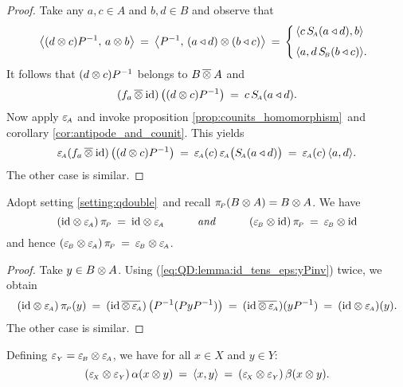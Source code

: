 \begin{proof}
Take any $a,c \in A$ and $b,d \in B$ and observe that
$$ \pairM{(d \tens c)P^{-1}}{a \tens b}
      \:=\:
   \pairM{P^{-1}}{(a \ract d) \tens (b \ract c)}
      \:=\,
   \left\{ \begin{array}{l}
   \!\!  \pair{c\, \SA(a \ract d)}{b} \\
   \!\!  \pair{a}{d\, \SB(b \ract c)}. \vertXL
   \end{array}\right.  $$
It follows that $(d \tens c)P^{-1}$ belongs to $B \fubtens A$ and
$$ (f_a \fubtens \id) \left( (d \tens c) P^{-1} \vertM\right) \:=\: c\, \SA(a \ract d).$$
Now apply $\epsA$ and invoke proposition \ref{prop:counits_homomorphism}\
and corollary \ref{cor:antipode_and_counit}\@. This yields
$$ \epsA (f_a \fubtens \id) \left( (d \tens c) P^{-1} \vertM\right)
    \:=\: \epsA(c) \, \epsA\! \left(\SA(a \ract d)\vertM\right)
    \:=\: \epsA(c) \, \pair{a}{d}. $$
The other case is similar.
\end{proof}



\begin{lemma} \label{lemma:QD:id_tens_eps:piP}
Adopt setting \ref{setting:qdouble}\ and recall\/ $\piP(B\tens A) = B\tens A$. We have
$$(\id \tens \epsA)\, \piP  \:=\:  \id \tens \epsA
         \itandspace{3em}
  (\epsB \tens \id)\, \piP  \:=\:  \epsB \tens \id $$
and hence\/ $(\epsB \tens \epsA)\, \piP  \:=\: \epsB \tens \epsA$.
\end{lemma}

\begin{proof}
Take $y \in B \tens A$. Using (\ref{eq:QD:lemma:id_tens_eps:yPinv}) twice, we obtain
$$    (\id \tens \epsA) \, \piP(y)
\:=\:
      (\id \, \overline{\tens \, \epsA\!}\,) \left(P^{-1} (P y P^{-1}) \vertM\right)
\:=\:
      (\id \, \overline{\tens \, \epsA\!}\,) (y P^{-1})
\:=\:
      (\id \tens \epsA)(y). $$
The other case is similar.
\end{proof}



\begin{cor} \label{cor:QD:epsX_tens_epsY:alpha}
Defining\/ $\epsY = \epsB \tens \epsA$, we have for all\/ $x \in X$ and\/ $y \in Y$:
\begin{equation}\label{eq:QD:epsX_tens_epsY:alpha}
 (\epsX \tens \epsY) \, \alpha (x \tens y) \:=\: \pair{x}{y}
      \:=\: (\epsX \tens \epsY) \, \beta (x \tens y).
\end{equation}
\end{cor}


